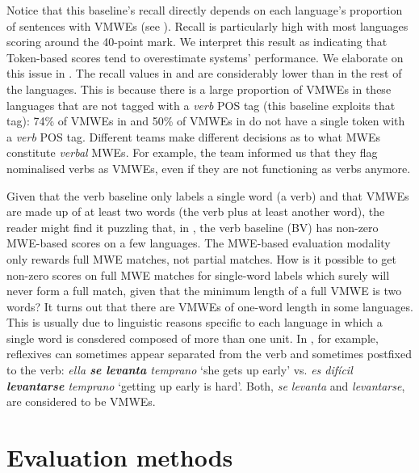 \documentclass[output=paper
,modfonts
,nonflat,draftmode]{langsci/langscibook}
\begin{document}
Notice that this baseline's recall directly depends on each language's proportion of sentences with VMWEs (see ). Recall is particularly high with most languages scoring around the 40-point mark. We interpret this result as indicating that Token-based scores tend to overestimate systems' performance. We elaborate on this issue in . The recall values in  and  are considerably lower than in the rest of the languages. This is because there is a large proportion of VMWEs in these languages that are not tagged with a \emph{verb} POS tag (this baseline exploits that tag): 74\% of VMWEs in  and 50\% of VMWEs in  do not have a single token with a \emph{verb} POS tag. Different teams make different decisions as to what MWEs constitute \emph{verbal} MWEs. For example, the  team informed us that they flag nominalised verbs as VMWEs, even if they are not functioning as verbs anymore.

Given that the verb baseline only labels a single word (a verb) and that VMWEs are made up of at least two words (the verb plus at least another word), the reader might find it puzzling that, in , the verb baseline (BV) has non-zero MWE-based scores on a few languages. The MWE-based evaluation modality only rewards full MWE matches, not partial matches. How is it possible to get non-zero scores on full MWE matches for single-word labels which surely will never form a full match, given that the minimum length of a full VMWE is two words? It turns out that there are VMWEs of one-word length in some languages. This is usually due to linguistic reasons specific to each language in which a single word is consdered composed of more than one unit. In , for example, reflexives can sometimes appear separated from the verb and sometimes postfixed to the verb: \emph{ella \textbf{se \mbox{levanta}} \mbox{temprano}} `she gets up early' vs. \emph{es \mbox{difícil} \textbf{\mbox{levantarse}} \mbox{temprano}} `getting up early is hard'. Both, \emph{se levanta} and \emph{levantarse}, are considered to be VMWEs. 



\section{\label{sec:eval-methods}Evaluation methods}
\end{document}
